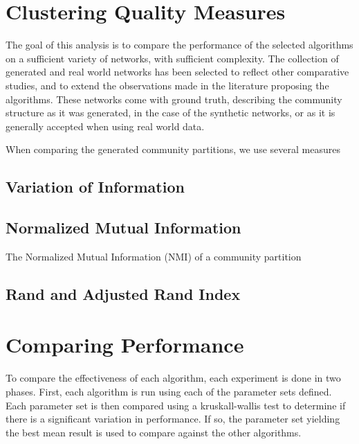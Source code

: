 \section{Clustering Quality Measures}
The goal of this analysis is to compare the performance of the selected algorithms on a sufficient variety of networks, with sufficient complexity. The collection of generated and real world networks has been selected to reflect other comparative studies, and to extend the observations made in the literature proposing the algorithms. These networks come with ground truth, describing the community structure as it was generated, in the case of the synthetic networks, or as it is generally accepted when using real world data.

When comparing the generated community partitions, we use several measures

\subsection{Variation of Information}
\cite{Marina2007}

\subsection{Normalized Mutual Information}
The Normalized Mutual Information (NMI) of a community partition 

\subsection{Rand and Adjusted Rand Index}
\cite{rand1971}


\section{Comparing Performance}

To compare the effectiveness of each algorithm, each experiment is done in two phases. First, each algorithm is run using each of the parameter sets defined. Each parameter set is then compared using a kruskall-wallis test to determine if there is a significant variation in performance. If so, the parameter set yielding the best mean result is used to compare against the other algorithms.